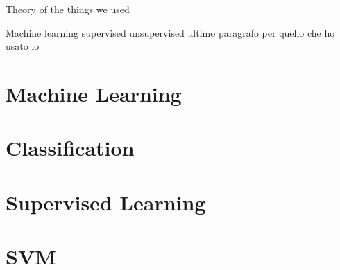 Theory of the things we used

Machine learning
supervised unsupervised
ultimo paragrafo per quello che ho usato io

\section{Machine Learning} \label{ml}

\section{Classification} \label{classification}

\section{Supervised Learning} \label{supervised}

\section{SVM} \label{svm}

